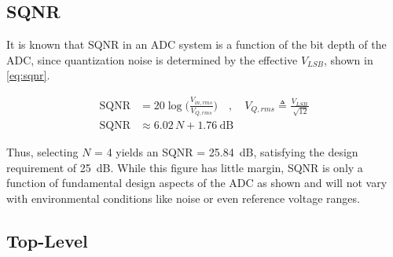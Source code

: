 \documentclass[11pt,letterpaper]{article}
\begin{document}
\subsection{SQNR}

It is known that SQNR in an ADC system is a function of the bit depth of the ADC, since quantization noise is determined by the effective \(V_{LSB}\), shown in \cref{eq:sqnr}.

\begin{align}
    \mathrm{SQNR} &= 20\log\biggl(\frac{V_{in,rms}}{V_{Q,rms}}\biggr) \quad , \quad V_{Q,rms} \triangleq \frac{V_{LSB}}{\sqrt[]{12}}\\
    \mathrm{SQNR} &\approx 6.02\,N + \qty{1.76}{\dB}\label{eq:sqnr}
\end{align}

Thus, selecting \(N\) = 4 yields an SQNR = \qty{25.84}{\dB}, satisfying the design requirement of \qty{25}{\dB}. While this figure has little margin, SQNR is only a function of fundamental design aspects of the ADC as shown and will not vary with environmental conditions like noise or even reference voltage ranges.

\subsection{Top-Level}
\end{document}
